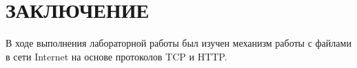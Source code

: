 \section*{ЗАКЛЮЧЕНИЕ}

В ходе выполнения лабораторной работы был изучен механизм работы с файлами в сети Internet на основе протоколов TCP и HTTP.

\newpage
